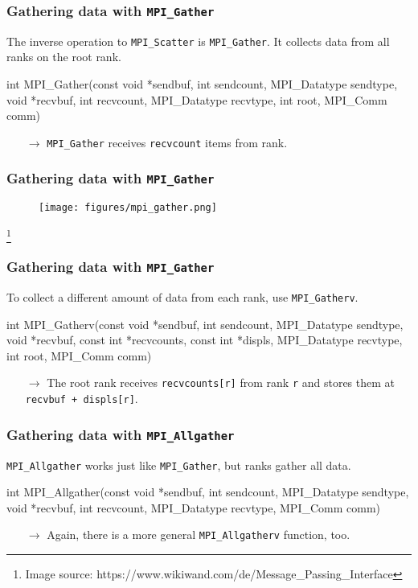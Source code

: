 \documentclass[12pt,t]{beamer}
\newcommand\blfootnote[1]{%
  \begingroup
  \renewcommand\thefootnote{}\footnote{\tiny #1}%
  \addtocounter{footnote}{-1}%
  \endgroup
}
\let\emph\relax %
\newcommand{\conclude}[1]{%
  \begin{itemize}
    \item[$\rightarrow$]#1
  \end{itemize}
}
\begin{document}
  \begin{frame}[fragile]
    \frametitle{Gathering data with \texttt{MPI\_Gather}}

    The inverse operation to \texttt{MPI\_Scatter} is \texttt{MPI\_Gather}.
    It collects data from all ranks on the root rank.
    \begin{code}
int MPI_Gather(const void *sendbuf,
               int sendcount,
               MPI_Datatype sendtype,
               void *recvbuf,
               int recvcount,
               MPI_Datatype recvtype,
               int root,
               MPI_Comm comm)
    \end{code}
    \conclude{\texttt{MPI\_Gather} receives \texttt{recvcount} items from \emph{each} rank.}
  \end{frame}

  \begin{frame}[fragile]
    \frametitle{Gathering data with \texttt{MPI\_Gather}}

    \begin{figure}
      \centering
      \texttt{[image: figures/mpi\_gather.png]}
    \end{figure}
    \blfootnote{Image source: https://www.wikiwand.com/de/Message\_Passing\_Interface}
  \end{frame}

  \begin{frame}[fragile]
    \frametitle{Gathering data with \texttt{MPI\_Gather}}

    To collect a different amount of data from each rank, use \texttt{MPI\_Gatherv}.
    \begin{code}
int MPI_Gatherv(const void *sendbuf,
                int sendcount,
                MPI_Datatype sendtype,
                void *recvbuf,
                const int *recvcounts,
                const int *displs,
                MPI_Datatype recvtype,
                int root,
                MPI_Comm comm)
    \end{code}
    \conclude{The root rank receives \texttt{recvcounts[r]} from rank \texttt{r} and stores them at \texttt{recvbuf + displs[r]}.}
  \end{frame}

  \begin{frame}[fragile]
    \frametitle{Gathering data with \texttt{MPI\_Allgather}}

    \texttt{MPI\_Allgather} works just like \texttt{MPI\_Gather}, but \emph{all} ranks gather all data.
    \begin{code}
int MPI_Allgather(const void *sendbuf,
                  int sendcount,
                  MPI_Datatype sendtype,
                  void *recvbuf,
                  int recvcount,
                  MPI_Datatype recvtype,
                  MPI_Comm comm)
    \end{code}
    \conclude{Again, there is a more general \texttt{MPI\_Allgatherv} function, too.}
  \end{frame}
\end{document}
